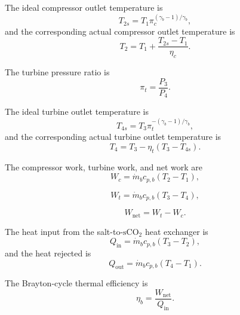\documentclass[a4paper,12pt]{article}
\begin{document}
The ideal compressor outlet temperature is
\begin{equation}
T_{2s}
=
T_1
\pi_c^{(\gamma_b-1)/\gamma_b},
\label{eq:compressor_ideal}
\end{equation}
and the corresponding actual compressor outlet temperature is
\begin{equation}
T_2
=
T_1
+
\frac{T_{2s}-T_1}{\eta_c}.
\label{eq:compressor_actual}
\end{equation}

The turbine pressure ratio is
\begin{equation}
\pi_t=\frac{P_3}{P_4}.
\label{eq:turbine_pressure_ratio}
\end{equation}

The ideal turbine outlet temperature is
\begin{equation}
T_{4s}
=
T_3
\pi_t^{-(\gamma_b-1)/\gamma_b},
\label{eq:turbine_ideal}
\end{equation}
and the corresponding actual turbine outlet temperature is
\begin{equation}
T_4
=
T_3
-
\eta_t
\left(
T_3-T_{4s}
\right).
\label{eq:turbine_actual}
\end{equation}

The compressor work, turbine work, and net work are
\begin{equation}
W_c
=
\dot{m}_b c_{p,b}
\left(
T_2-T_1
\right),
\label{eq:compressor_work}
\end{equation}

\begin{equation}
W_t
=
\dot{m}_b c_{p,b}
\left(
T_3-T_4
\right),
\label{eq:turbine_work}
\end{equation}

\begin{equation}
W_{\mathrm{net}}
=
W_t-W_c.
\label{eq:net_work}
\end{equation}

The heat input from the salt-to-\(\mathrm{sCO_2}\) heat exchanger is
\begin{equation}
Q_{\mathrm{in}}
=
\dot{m}_b c_{p,b}
\left(
T_3-T_2
\right),
\label{eq:brayton_heat_input}
\end{equation}
and the heat rejected is
\begin{equation}
Q_{\mathrm{out}}
=
\dot{m}_b c_{p,b}
\left(
T_4-T_1
\right).
\label{eq:brayton_heat_rejection}
\end{equation}

The Brayton-cycle thermal efficiency is
\begin{equation}
\eta_b
=
\frac{W_{\mathrm{net}}}{Q_{\mathrm{in}}}.
\label{eq:brayton_efficiency}
\end{equation}
\end{document}
